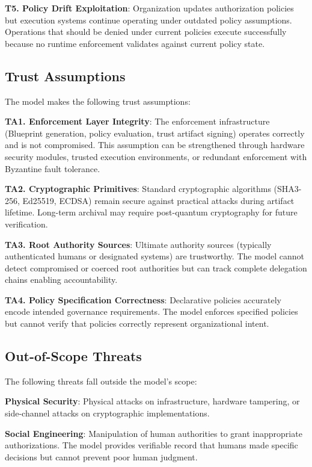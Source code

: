 \documentclass[11pt,letterpaper]{article}
\begin{document}
\textbf{T5. Policy Drift Exploitation}: Organization updates authorization policies but execution systems continue operating under outdated policy assumptions. Operations that should be denied under current policies execute successfully because no runtime enforcement validates against current policy state.

\subsection{Trust Assumptions}

The model makes the following trust assumptions:

\textbf{TA1. Enforcement Layer Integrity}: The enforcement infrastructure (Blueprint generation, policy evaluation, trust artifact signing) operates correctly and is not compromised. This assumption can be strengthened through hardware security modules, trusted execution environments, or redundant enforcement with Byzantine fault tolerance.

\textbf{TA2. Cryptographic Primitives}: Standard cryptographic algorithms (SHA3-256, Ed25519, ECDSA) remain secure against practical attacks during artifact lifetime. Long-term archival may require post-quantum cryptography for future verification.

\textbf{TA3. Root Authority Sources}: Ultimate authority sources (typically authenticated humans or designated systems) are trustworthy. The model cannot detect compromised or coerced root authorities but can track complete delegation chains enabling accountability.

\textbf{TA4. Policy Specification Correctness}: Declarative policies accurately encode intended governance requirements. The model enforces specified policies but cannot verify that policies correctly represent organizational intent.

\subsection{Out-of-Scope Threats}

The following threats fall outside the model's scope:

\textbf{Physical Security}: Physical attacks on infrastructure, hardware tampering, or side-channel attacks on cryptographic implementations.

\textbf{Social Engineering}: Manipulation of human authorities to grant inappropriate authorizations. The model provides verifiable record that humans made specific decisions but cannot prevent poor human judgment.
\end{document}
